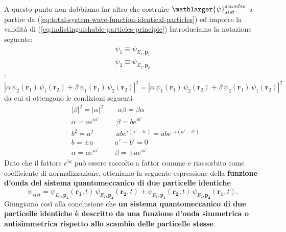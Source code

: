 A questo punto non dobbiamo far altro che costruire $ \mathlarger{\psi}^{scambio}_{sist}$
a partire da (\ref{eq:total-system-wave-function-identical-particles}) ed imporre la validità di (\ref{eq:indistinguishable-particles-principle})\sidenote
{
Introduciamo la notazione seguente:
\begin{gather*}
    \psi_1 \equiv \psi_{E_1,\bm{p}_1} \\
    \psi_2 \equiv \psi_{E_2,\bm{p}_2}
\end{gather*}
}:
\[
    |\alpha\, \psi_2(\bm{r}_1)\,\psi_1(\bm{r}_2) + \beta\, \psi_1(\bm{r}_1)\,\psi_2(\bm{r}_2)|^2 =
    |\alpha\, \psi_1(\bm{r}_1)\,\psi_2(\bm{r}_2) + \beta\, \psi_2(\bm{r}_1)\,\psi_1(\bm{r}_2)|^2
\]
da cui si ottengono le condizioni seguenti
\begin{align*}
    &|\beta|^{2} = |\alpha|^{2} \qquad \alpha \bar{\beta} = \beta \bar{\alpha}  \\
    &\alpha = ae^{ ia' } \quad \ \  \quad  \beta = b e^{ ib' }  \\
    &b^{2} = a^{2} \qquad \quad \, ab e^{ i(a'-b') } = abe^{ -i(a'-b') } \\
    &b = \pm a \qquad \quad a'-b'=0 \\
    &\alpha = a e^{ ia' } \qquad \ \beta = \pm ae^{ ia' }
\end{align*}
Dato che il fattore $ e^{ia}$ può essere raccolto a fattor comune e riassorbito come
coefficiente di normalizzazione, otteniamo la seguente espressione della \textbf{funzione d’onda del sistema quantomeccanico
di due particelle identiche}
\begin{equation}
    \psi_{sist} = \psi_{E_1, \bm{p_1}} (\bm{r_1}, t) \, \psi_{E_2, \bm{p_2}} (\bm{r_2}, t) \pm \psi_{E_1, \bm{p_1}} (\bm{r_2}, t) \, \psi_{E_2, \bm{p_2}} (\bm{r_1}, t).
    \label{eq:identical-particles-wave-function}
\end{equation}
Giungiamo così alla conclusione che \textbf{un sistema quantomeccanico di due particelle identiche è descritto da una funzione
d’onda simmetrica o antisimmetrica rispetto allo scambio delle particelle stesse}.

